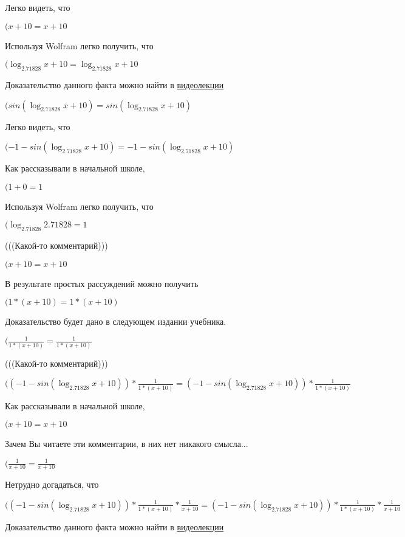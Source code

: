 \documentclass[12pt,a4paper,fleqn]{article}
\theoremstyle{definition}
\begin{document}
Легко видеть, что

$( x  +  10  =  x  +  10 $

Используя Wolfram легко получить, что

$(\log_{ 2.71828 }{ x  +  10 } = \log_{ 2.71828 }{ x  +  10 }$

Доказательство данного факта можно найти в \href{https://www.youtube.com/watch?v=dQw4w9WgXcQ}{видеолекции}

$(sin(\log_{ 2.71828 }{ x  +  10 }) = sin(\log_{ 2.71828 }{ x  +  10 })$

Легко видеть, что

$( -1  - sin(\log_{ 2.71828 }{ x  +  10 }) =  -1  - sin(\log_{ 2.71828 }{ x  +  10 })$

Как рассказывали в начальной школе,

$( 1  +  0  =  1 $

Используя Wolfram легко получить, что

$(\log_{ 2.71828 }{ 2.71828 } =  1 $

(((Какой-то комментарий)))

$( x  +  10  =  x  +  10 $

В результате простых рассуждений можно получить

$( 1  * ( x  +  10 ) =  1  * ( x  +  10 )$

Доказательство будет дано в следующем издании учебника.

$(\frac{ 1 }{ 1  * ( x  +  10 )}
 = \frac{ 1 }{ 1  * ( x  +  10 )}
$

(((Какой-то комментарий)))

$(( -1  - sin(\log_{ 2.71828 }{ x  +  10 })) * \frac{ 1 }{ 1  * ( x  +  10 )}
 = ( -1  - sin(\log_{ 2.71828 }{ x  +  10 })) * \frac{ 1 }{ 1  * ( x  +  10 )}
$

Как рассказывали в начальной школе,

$( x  +  10  =  x  +  10 $

Зачем Вы читаете эти комментарии, в них нет никакого смысла...

$(\frac{ 1 }{ x  +  10 }
 = \frac{ 1 }{ x  +  10 }
$

Нетрудно догадаться, что

$(( -1  - sin(\log_{ 2.71828 }{ x  +  10 })) * \frac{ 1 }{ 1  * ( x  +  10 )}
 * \frac{ 1 }{ x  +  10 }
 = ( -1  - sin(\log_{ 2.71828 }{ x  +  10 })) * \frac{ 1 }{ 1  * ( x  +  10 )}
 * \frac{ 1 }{ x  +  10 }
$

Доказательство данного факта можно найти в \href{https://www.youtube.com/watch?v=dQw4w9WgXcQ}{видеолекции}
\end{document}

